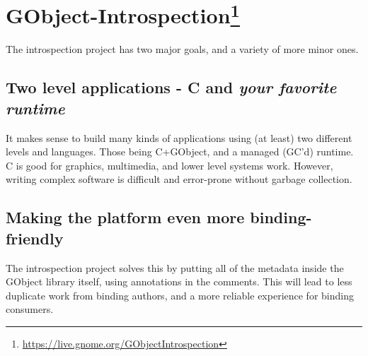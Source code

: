 
\section[GObject-Introspection]{GObject-Introspection\footnote{\url{https://live.gnome.org/GObjectIntrospection}}}\label{g-i}

The introspection project has two major goals, and a variety of more minor ones.

\subsection{Two level applications - C and \emph{your favorite runtime}}

It makes sense to build many kinds of applications using (at least) two different levels and languages. Those being C+GObject, and a managed (GC'd) runtime. C is good for graphics, multimedia, and lower level systems work. However, writing complex software is difficult and error-prone without garbage collection.

\subsection{Making the platform even more binding-friendly}

The introspection project solves this by putting all of the metadata inside the GObject library itself, using annotations in the comments. This will lead to less duplicate work from binding authors, and a more reliable experience for binding consumers.
